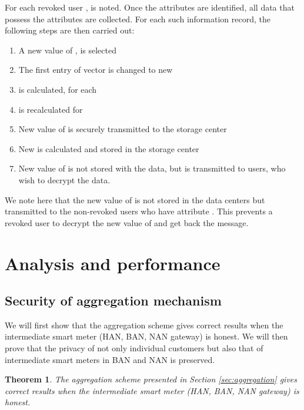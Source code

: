 \documentclass[conference]{IEEEtran}[10pt]
\newtheorem{theorem}{Theorem}
\begin{document}
For each revoked user ,   is noted. 
Once the attributes   are identified,
all data that possess the  attributes are collected.
For each such information record, the following steps are then carried out:
\begin{enumerate}
\item A new value of ,  is selected
\item The first entry of vector  is changed to new 
\item  is calculated, for each 
\item  is recalculated for 
\item New value of  is securely transmitted to the storage center
\item New  is calculated and stored in the storage center
\item New value of  is not stored with the data, but is transmitted to users, who wish to decrypt the data.
\end{enumerate}




We note here that the new value of  is not stored in the data centers but transmitted to the non-revoked users who have attribute . 
This prevents a revoked user to decrypt the new value of  and get back the message. 



\section{Analysis and performance}
\label{sec:analysis}

\subsection{Security of aggregation mechanism}
\label{subsec:security-aggregation}
We will first show that the aggregation scheme gives correct results when the intermediate smart meter (HAN, BAN, NAN gateway) is honest.
We will then prove that the privacy of not only individual customers but also that of intermediate smart meters in BAN and NAN is preserved.

\begin{theorem}
The aggregation scheme presented in Section \ref{sec:aggregation} gives correct results when the intermediate smart meter (HAN, BAN, NAN gateway) is honest.
\end{theorem}
\end{document}
